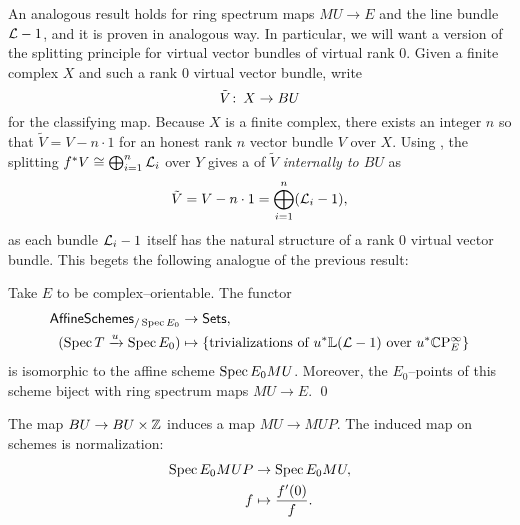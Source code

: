 An analogous result holds for ring spectrum maps $MU \to E$ and the line bundle $\mathcal{L} - 1$, and it is proven in analogous way.  In particular, we will want a version of the splitting principle for virtual vector bundles of virtual rank $0$.  Given a finite complex $X$ and such a rank $0$ virtual vector bundle, write \[\tilde V \colon\thinspace X \to BU\] for the classifying map.  Because $X$ is a finite complex, there exists an integer $n$ so that $\tilde V = V - n \cdot 1$ for an honest rank $n$ vector bundle $V$ over $X$.  Using , the splitting $f^* V \cong \bigoplus_{i=1}^n \mathcal{L}_i$ over $Y$ gives a of $\tilde V$ \emph{internally to $BU$} as \[\tilde V = V - n \cdot 1 = \bigoplus_{i=1}^n (\mathcal{L}_i - 1),\] as each bundle $\mathcal{L}_i - 1$ itself has the natural structure of a rank $0$ virtual vector bundle.  This begets the following analogue of the previous result:
\begin{theorem}\label{BUTriumvirate}
Take $E$ to be complex--orientable.  The functor
\begin{align*}
\mathsf{AffineSchemes}_{/\operatorname{Spec} E_0} & \to \mathsf{Sets}, \\
(\operatorname{Spec} T \xrightarrow{u} \operatorname{Spec} E_0) & \mapsto \left\{ \text{trivializations of $u^* \mathbb{L}(\mathcal{L} - 1)$ over $u^* \mathbb{C}\mathrm P^\infty_E$} \right\}
\end{align*}
is isomorphic to the affine scheme $\operatorname{Spec} E_0 MU$.  Moreover, the $E_0$--points of this scheme biject with ring spectrum maps $MU \to E$. \qed
{}
\end{theorem}

\begin{remark}
The map $BU \to BU \times \mathbb Z$ induces a map $MU \to MUP$.  The induced map on schemes is normalization:
\begin{align*}
\operatorname{Spec} E_0 MUP & \to \operatorname{Spec} E_0 MU, \\
f & \mapsto \frac{f'(0)}{f}.
\end{align*}
\end{remark}

